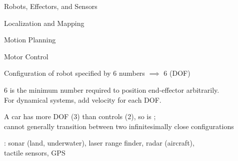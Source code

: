 \documentclass{article}
\begin{document}
\begin{huge}

\sf


Robots, Effectors, and Sensors

Localization and Mapping

Motion Planning

Motor Control


\centerline{\qquad {}}

\centerline{\qquad {}}



\vspace*{0.2in}

\textwidth
{}

Configuration of robot specified by 6 numbers\al
$\implies$ 6  (DOF)

6 is the minimum number required to position end-effector arbitrarily.\\
For dynamical systems, add velocity for each DOF.



\vspace*{0.2in}

\textwidth
{}

A car has more DOF (3) than controls (2), so is ;\\
cannot generally transition between two infinitesimally close configurations



: sonar (land, underwater), laser range finder, radar (aircraft),\\
tactile sensors, GPS

\vspace*{0.2in}


\end{huge}
\end{document}
